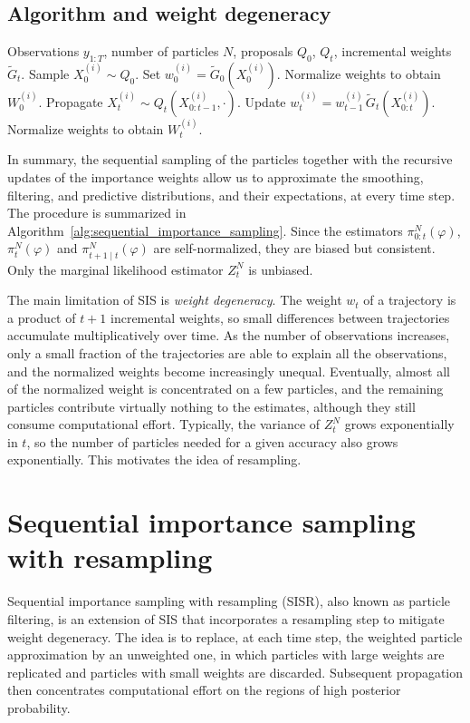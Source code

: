 \subsection{Algorithm and weight degeneracy}
\begin{algorithm}[H]
\caption{Sequential importance sampling}
\label{alg:sequential_importance_sampling}
\begin{algorithmic}[1]
    \REQUIRE Observations $y_{1:T}$, number of particles $N$, proposals $Q_0$, $Q_t$, incremental weights $\tilde{G}_t$.
        \STATE Sample $X_0^{(i)}\sim Q_0$.
        \STATE Set $w_0^{(i)} = \tilde{G}_0(X_0^{(i)})$.
    \ENDFOR
    \STATE Normalize weights to obtain $W_0^{(i)}$.
            \STATE Propagate $X_t^{(i)}\sim Q_t(X_{0:t-1}^{(i)},\cdot)$.
            \STATE Update $w_t^{(i)} = w_{t-1}^{(i)}\,\tilde{G}_t(X_{0:t}^{(i)})$.
        \ENDFOR
        \STATE Normalize weights to obtain $W_t^{(i)}$.
    \ENDFOR
\end{algorithmic}
\end{algorithm}

In summary, the sequential sampling of the particles together with the recursive updates of the importance weights allow us to approximate the smoothing, filtering, and predictive distributions, and their expectations, at every time step. The procedure is summarized in Algorithm~\ref{alg:sequential_importance_sampling}. Since the estimators $\pi_{0:t}^N(\varphi)$, $\pi_t^N(\varphi)$ and $\pi_{t+1\mid t}^N(\varphi)$ are self-normalized, they are biased but consistent. Only the marginal likelihood estimator $Z_t^N$ is unbiased.

The main limitation of SIS is \emph{weight degeneracy}. The weight $w_t$ of a trajectory is a product of $t+1$ incremental weights, so small differences between trajectories accumulate multiplicatively over time. As the number of observations increases, only a small fraction of the trajectories are able to explain all the observations, and the normalized weights become increasingly unequal. Eventually, almost all of the normalized weight is concentrated on a few particles, and the remaining particles contribute virtually nothing to the estimates, although they still consume computational effort. Typically, the variance of $Z_t^N$ grows exponentially in $t$, so the number of particles needed for a given accuracy also grows exponentially. This motivates the idea of resampling.

\section{Sequential importance sampling with resampling}
\label{sec:sequential_importance_sampling_with_resampling}
Sequential importance sampling with resampling (SISR), also known as particle filtering, is an extension of SIS that incorporates a resampling step to mitigate weight degeneracy. The idea is to replace, at each time step, the weighted particle approximation by an unweighted one, in which particles with large weights are replicated and particles with small weights are discarded. Subsequent propagation then concentrates computational effort on the regions of high posterior probability.

